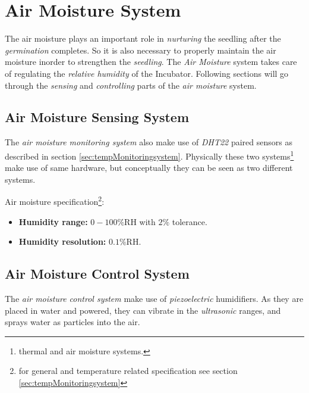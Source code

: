 \documentclass[../../main]{subfiles}
\begin{document}
\section{Air Moisture System} \label{sec:}

The air moisture plays an important role in \emph{nurturing} the seedling after the \emph{germination}
completes. So it is also necessary to properly maintain the air moisture inorder to strengthen the
\emph{seedling}. The \emph{Air Moisture} system takes care of regulating the \emph{relative humidity} of the Incubator.
Following sections will go through the \emph{sensing} and \emph{controlling} parts of the \emph{air moisture}
system.

\subsection{Air Moisture Sensing System}

The \emph{air moisture monitoring system} also make use of \emph{DHT22} paired sensors
as described in section \ref{sec:tempMonitoringsystem}. Physically these two
systems\footnote{thermal and air moisture systems.} make use of same hardware,
but conceptually they can be seen as two different systems.

Air moisture specification\footnote{for general and temperature related specification
see section \ref{sec:tempMonitoringsystem}}:

\begin{itemize}
    \item \textbf{Humidity range:} $0-100\%$RH with $2\%$ tolerance.
    \item \textbf{Humidity resolution:} $0.1\%$RH.
\end{itemize}


\subsection{Air Moisture Control System}

The \emph{air moisture control system} make use of \emph{piezoelectric} humidifiers.
As they are placed in water and powered, they can vibrate in the \emph{ultrasonic} ranges,
and sprays water as particles into the air.

\end{document}

